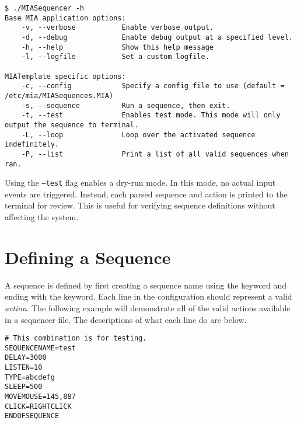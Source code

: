 \begin{lstlisting}[style=terminalstyle]
$ ./MIASequencer -h
Base MIA application options:
	-v, --verbose           Enable verbose output.
	-d, --debug             Enable debug output at a specified level.
	-h, --help              Show this help message
	-l, --logfile           Set a custom logfile.

MIATemplate specific options:
	-c, --config            Specify a config file to use (default = /etc/mia/MIASequences.MIA)
	-s, --sequence          Run a sequence, then exit.
	-t, --test              Enables test mode. This mode will only output the sequence to terminal.
	-L, --loop              Loop over the activated sequence indefinitely.
	-P, --list              Print a list of all valid sequences when ran.
\end{lstlisting}

Using the \texttt{--test} flag enables a dry-run mode. In this mode, no actual input events are triggered. Instead, each parsed sequence and action is printed to the terminal for review. This is useful for verifying sequence definitions without affecting the system.


\section{Defining a Sequence}

A sequence is defined by first creating a sequence name using the  keyword and ending with the  keyword. Each line in the configuration should represent a valid \textit{action}. The following example will demonstrate all of the valid actions available in a sequencer file. The descriptions of what each line do are below.

\begin{lstlisting}[style=pythonstyle]
# This combination is for testing.
SEQUENCENAME=test
DELAY=3000
LISTEN=10
TYPE=abcdefg
SLEEP=500
MOVEMOUSE=145,887
CLICK=RIGHTCLICK
ENDOFSEQUENCE
\end{lstlisting}

